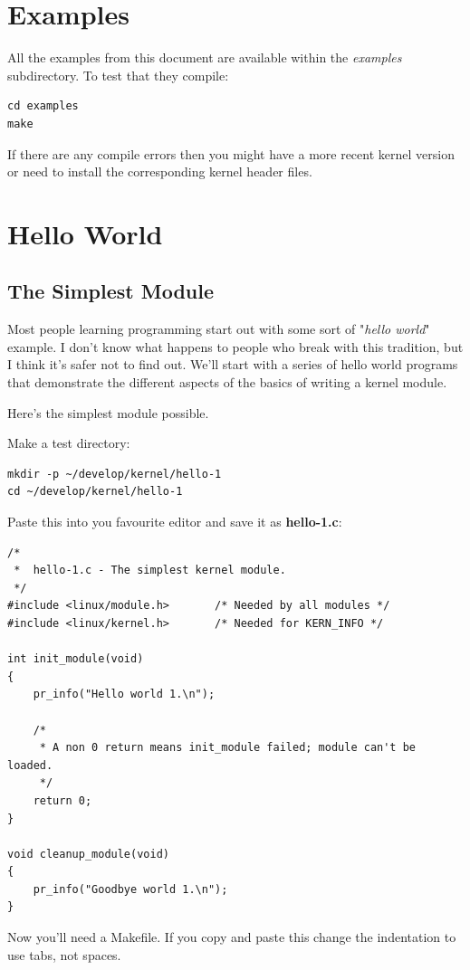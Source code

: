 \documentclass[11pt]{article}
\begin{document}
\section*{Examples}
\label{sec-3}
All the examples from this document are available within the \emph{examples} subdirectory. To test that they compile:

\begin{verbatim}
cd examples
make
\end{verbatim}

If there are any compile errors then you might have a more recent kernel version or need to install the corresponding kernel header files.
\section*{Hello World}
\label{sec-4}
\subsection*{The Simplest Module}
\label{sec-4-1}
Most people learning programming start out with some sort of "\emph{hello world}" example. I don't know what happens to people who break with this tradition, but I think it's safer not to find out. We'll start with a series of hello world programs that demonstrate the different aspects of the basics of writing a kernel module.

Here's the simplest module possible.

Make a test directory:

\begin{verbatim}
mkdir -p ~/develop/kernel/hello-1
cd ~/develop/kernel/hello-1
\end{verbatim}

Paste this into you favourite editor and save it as \textbf{hello-1.c}:

\begin{verbatim}
/*
 *  hello-1.c - The simplest kernel module.
 */
#include <linux/module.h>       /* Needed by all modules */
#include <linux/kernel.h>       /* Needed for KERN_INFO */

int init_module(void)
{
    pr_info("Hello world 1.\n");

    /*
     * A non 0 return means init_module failed; module can't be loaded.
     */
    return 0;
}

void cleanup_module(void)
{
    pr_info("Goodbye world 1.\n");
}
\end{verbatim}

Now you'll need a Makefile. If you copy and paste this change the indentation to use tabs, not spaces.
\end{document}
